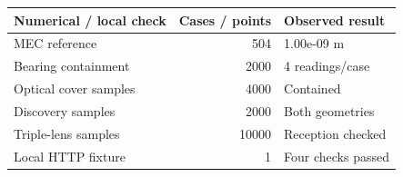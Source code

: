 \begin{tabular}{lrl}
\toprule
Numerical / local check & Cases / points & Observed result \\
\midrule
MEC reference & 504 & 1.00e-09 m \\
Bearing containment & 2000 & 4 readings/case \\
Optical cover samples & 4000 & Contained \\
Discovery samples & 2000 & Both geometries \\
Triple-lens samples & 10000 & Reception checked \\
Local HTTP fixture & 1 & Four checks passed \\
\bottomrule
\end{tabular}

